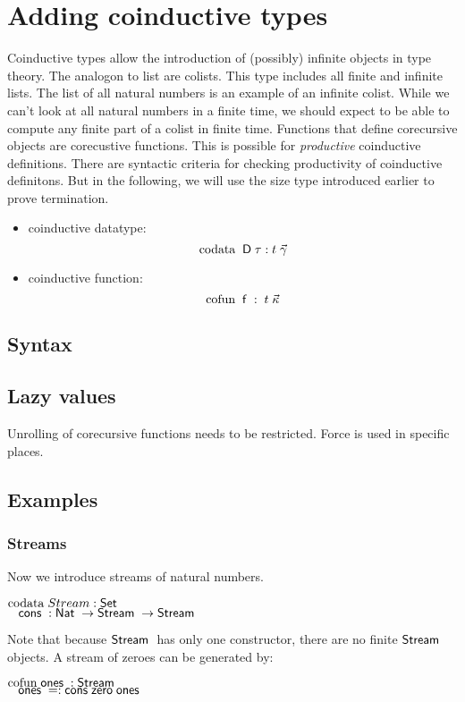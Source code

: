 \chapter{Adding coinductive types}

Coinductive types allow the introduction of (possibly) infinite objects in type theory.
The analogon to list are colists. This type includes all finite and infinite lists.
The list of all natural numbers is an example of an infinite colist.
While we can't look at all natural numbers in a finite time, we should expect to be able to
compute any finite part of a colist in finite time.
Functions that define corecursive objects are corecustive functions.
This is possible for \emph{productive} coinductive definitions.
There are syntactic criteria for checking productivity of coinductive definitons.
But in the following, we will use the size type introduced earlier to prove termination.

\begin{itemize}
\item
coinductive datatype:
\[\mathrm{codata}\; \; \mathsf{D} \; \tau : t \; \vec{\gamma}\]  

\item
coinductive function:
\[\mathrm{cofun}\; \; \mathsf{f} \; : \; t \; \vec{\kappa}\]
\end{itemize}

\section{Syntax}

\section{Lazy values}
Unrolling of corecursive functions needs to be restricted.
Force is used in specific places.

\section{Examples}

\subsection{Streams}
Now we introduce streams of natural numbers.
\begin{bsp}
$\mathrm{codata}\; Stream : \mathsf{Set} $ \\
$\hspace*{3mm} \mathsf{cons}\; : \mathsf{Nat}\; \rightarrow \mathsf{Stream}\; \rightarrow \mathsf{Stream}\; $
\end{bsp}
Note that because $\mathsf{Stream}\;$ has only one constructor, there are no finite $\mathsf{Stream}\;$ objects.
A stream of zeroes can be generated by:
\begin{bsp}
$\mathrm{cofun}\; \mathsf{ones}\;: \mathsf{Stream}\; $ \\
$\hspace*{3mm} \mathsf{ones}\; = : \mathsf{cons}\; \mathsf{zero}\; \mathsf{ones}\;$
\end{bsp}

